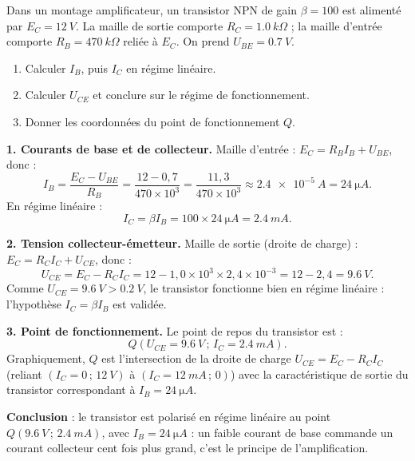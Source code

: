 \documentclass[11pt]{article}
\newcommand{\cle}[1]{{\popxbold\color{popdark}#1}}
\begin{document}
\begin{exoresolu}
Dans un montage amplificateur, un transistor NPN de gain $\beta = 100$ est alimenté par $E_C = \SI{12}{V}$. La maille de sortie comporte $R_C = \SI{1,0}{k\Omega}$ ; la maille d'entrée comporte $R_B = \SI{470}{k\Omega}$ reliée à $E_C$. On prend $U_{BE} = \SI{0,7}{V}$.
\begin{enumerate}
\item Calculer $I_B$, puis $I_C$ en régime linéaire.
\item Calculer $U_{CE}$ et conclure sur le régime de fonctionnement.
\item Donner les coordonnées du point de fonctionnement $Q$.
\end{enumerate}
\tcblower
\textbf{1. Courants de base et de collecteur.} Maille d'entrée : $E_C = R_B I_B + U_{BE}$, donc :
\[ I_B = \frac{E_C - U_{BE}}{R_B} = \frac{12 - 0{,}7}{470 \times 10^{3}} = \frac{11{,}3}{470 \times 10^{3}} \approx \SI{2,4e-5}{A} = \SI{24}{\micro A}. \]
En régime linéaire :
\[ I_C = \beta I_B = 100 \times \SI{24}{\micro A} = \SI{2,4}{mA}. \]

\textbf{2. Tension collecteur-émetteur.} Maille de sortie (droite de charge) : $E_C = R_C I_C + U_{CE}$, donc :
\[ U_{CE} = E_C - R_C I_C = 12 - 1{,}0 \times 10^{3} \times 2{,}4 \times 10^{-3} = 12 - 2{,}4 = \SI{9,6}{V}. \]
Comme $U_{CE} = \SI{9,6}{V} > \SI{0,2}{V}$, le transistor fonctionne bien en \cle{régime linéaire} : l'hypothèse $I_C = \beta I_B$ est validée.

\textbf{3. Point de fonctionnement.} Le point de repos du transistor est :
\[ Q\left(U_{CE} = \SI{9,6}{V}\,;\,I_C = \SI{2,4}{mA}\right). \]
Graphiquement, $Q$ est l'intersection de la droite de charge $U_{CE} = E_C - R_C I_C$ (reliant $(I_C = 0\,;\,\SI{12}{V})$ à $(I_C = \SI{12}{mA}\,;\,0)$) avec la caractéristique de sortie du transistor correspondant à $I_B = \SI{24}{\micro A}$.

\textbf{Conclusion} : le transistor est polarisé en régime linéaire au point $Q(\SI{9,6}{V}\,;\,\SI{2,4}{mA})$, avec $I_B = \SI{24}{\micro A}$ : un faible courant de base commande un courant collecteur cent fois plus grand, c'est le principe de l'amplification.
\end{exoresolu}
\end{document}
